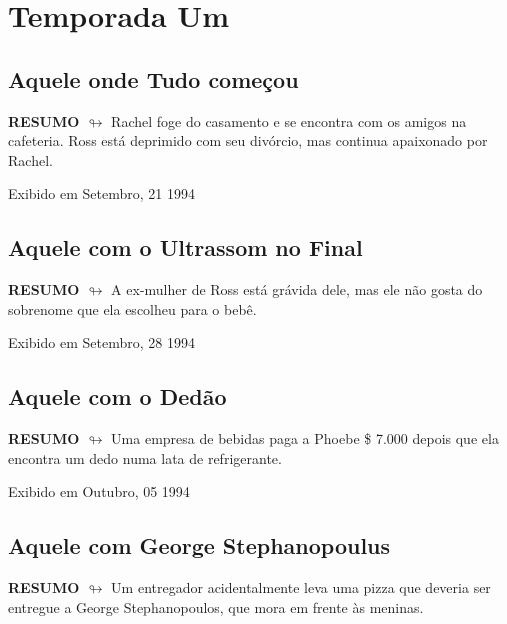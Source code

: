 \part{Temporada Um}

\chapter{Aquele onde Tudo começou}

\textbf{RESUMO $\looparrowright$} Rachel foge do casamento e se encontra com os amigos na cafeteria. Ross está deprimido com seu divórcio, mas continua apaixonado por Rachel.

\begin{flushright}
\textcolor{gray600}{Exibido em Setembro, 21 1994}
\end{flushright}


\chapter{Aquele com o Ultrassom no Final}

\textbf{RESUMO $\looparrowright$} A ex-mulher de Ross está grávida dele, mas ele não gosta do sobrenome que ela escolheu para o bebê.

\begin{flushright}
\textcolor{gray600}{Exibido em Setembro, 28 1994}
\end{flushright}


\chapter{Aquele com o Dedão}

\textbf{RESUMO $\looparrowright$} Uma empresa de bebidas paga a Phoebe \$ 7.000 depois que ela encontra um dedo numa lata de refrigerante.

\begin{flushright}
\textcolor{gray600}{Exibido em Outubro, 05 1994}
\end{flushright}


\chapter{Aquele com George Stephanopoulus}

\textbf{RESUMO $\looparrowright$} Um entregador acidentalmente leva uma pizza que deveria ser entregue a George Stephanopoulos, que mora em frente às meninas.

